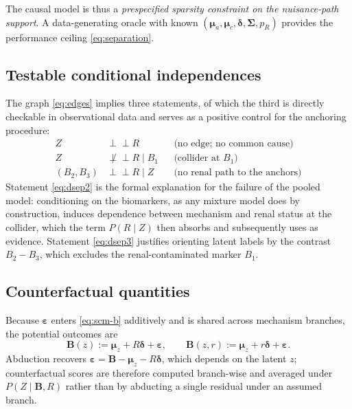 The causal model is thus a \emph{prespecified sparsity constraint on the
nuisance-path support}. A data-generating oracle with known
$(\bm{\mu}_a, \bm{\mu}_c, \bm{\delta}, \bm{\Sigma}, p_R)$ provides the
performance ceiling \eqref{eq:separation}.

\subsection{Testable conditional independences}

The graph \eqref{eq:edges} implies three statements, of which the third
is directly checkable in observational data and serves as a positive
control for the anchoring procedure:
\begin{align}
  Z &\perp\!\!\!\perp R && \text{(no edge; no common cause)} \label{eq:dsep1}\\
  Z &\not\perp\!\!\!\perp R \mid B_1 && \text{(collider at $B_1$)} \label{eq:dsep2}\\
  (B_2, B_3) &\perp\!\!\!\perp R \mid Z && \text{(no renal path to the anchors)} \label{eq:dsep3}
\end{align}
Statement \eqref{eq:dsep2} is the formal explanation for the failure of
the pooled model: conditioning on the biomarkers, as any mixture model
does by construction, induces dependence between mechanism and renal
status at the collider, which the term $P(R \mid Z)$ then absorbs and
subsequently uses as evidence. Statement \eqref{eq:dsep3} justifies
orienting latent labels by the contrast $B_2 - B_3$, which excludes the
renal-contaminated marker $B_1$.

\subsection{Counterfactual quantities}

Because $\bm{\varepsilon}$ enters \eqref{eq:scm-b} additively and is
shared across mechanism branches, the potential outcomes are
\begin{equation}
  \mathbf{B}(z) := \bm{\mu}_z + R\bm{\delta} + \bm{\varepsilon},
  \qquad
  \mathbf{B}(z, r) := \bm{\mu}_z + r\bm{\delta} + \bm{\varepsilon}.
  \label{eq:potential-outcomes}
\end{equation}
Abduction recovers
$\bm{\varepsilon} = \mathbf{B} - \bm{\mu}_z - R\bm{\delta}$, which depends
on the latent $z$; counterfactual scores are therefore computed
branch-wise and averaged under $P(Z \mid \mathbf{B}, R)$ rather than by
abducting a single residual under an assumed branch.

